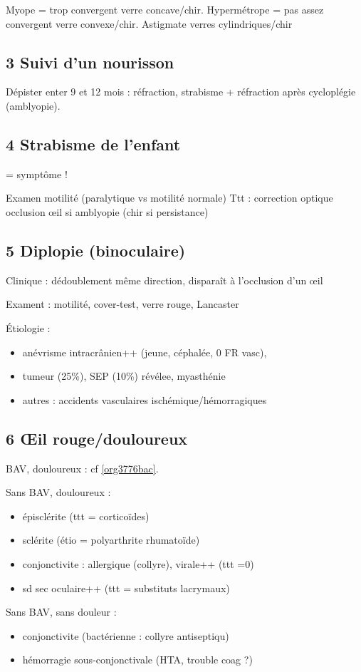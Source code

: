 \documentclass[11pt]{article}
\begin{document}
Myope = trop convergent \thus verre concave/chir. Hypermétrope = pas assez convergent
\thus verre convexe/chir. Astigmate \thus verres cylindriques/chir
\subsection{3 Suivi d'un nourisson}
\label{sec:org377e670}
Dépister enter 9 et 12 mois : réfraction, strabisme + réfraction après
cycloplégie (amblyopie).
\subsection{4 Strabisme de l'enfant}
\label{sec:org9cad7ec}
= symptôme !

Examen motilité (paralytique vs motilité normale)
Ttt : correction optique \textpm{} occlusion \oe{}il si amblyopie (chir si persistance)
\subsection{5 Diplopie (binoculaire)}
\label{sec:org9c72580}
Clinique : dédoublement même direction, disparaît à l'occlusion d'un \oe{}il

Exament : motilité, cover-test, verre rouge, Lancaster

Étiologie :
\begin{itemize}
\item anévrisme intracrânien++ (jeune, céphalée, 0 FR vasc),
\item tumeur (25\%), SEP (10\%) révélee, myasthénie
\item autres : accidents vasculaires ischémique/hémorragiques
\end{itemize}
\subsection{6 \OE{}il rouge/douloureux}
\label{sec:orga00098a}
BAV, douloureux : cf \ref{org3776bac}.

Sans BAV, douloureux : 
\begin{itemize}
\item épisclérite (ttt = corticoïdes)
\item sclérite (étio = polyarthrite rhumatoïde)
\item conjonctivite : allergique (collyre), virale++ (ttt =0)
\item sd sec oculaire++ (ttt = substituts lacrymaux)
\end{itemize}

Sans BAV, sans douleur : 
\begin{itemize}
\item conjonctivite (bactérienne : collyre antiseptiqu)
\item hémorragie sous-conjonctivale (HTA, trouble coag ?)
\end{itemize}
\end{document}
